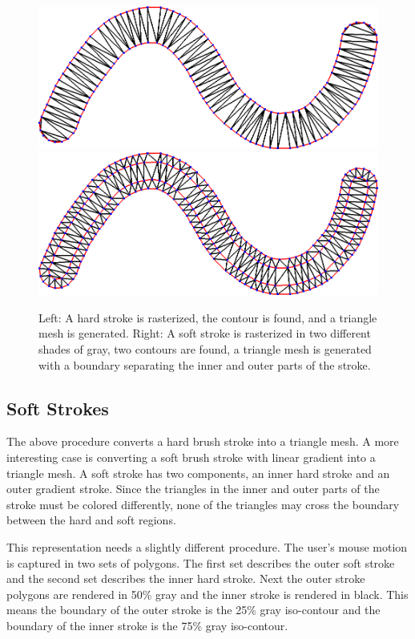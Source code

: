 \documentclass[review]{acmsiggraph}
\begin{document}
\begin{figure}
        \includegraphics[width=\w]{images/stroke_triangulation/hardmesh}
        \includegraphics[width=\w]{images/stroke_triangulation/softmesh}
    \caption{Left: A hard stroke is rasterized, the contour is found, and a triangle mesh is generated.
             Right: A soft stroke is rasterized in two different shades of gray, two contours are found,
             a triangle mesh is generated with a boundary separating the inner and outer parts of the stroke.}
    \label{fig:rastertotriangles}
\end{figure}



\subsection{Soft Strokes}
The above procedure converts a hard brush stroke into a triangle mesh. A more interesting
case is converting a soft brush stroke with linear gradient into a triangle mesh. A soft stroke has two
components, an inner hard stroke and an outer gradient stroke. Since the triangles in the inner and
outer parts of the stroke must be colored differently, none of the triangles may cross the boundary
between the hard and soft regions.

This representation needs a slightly different procedure. The user's mouse motion
is captured in two sets of polygons. The first set describes the outer soft stroke and the second set describes
the inner hard stroke. Next the outer stroke polygons are rendered in 50\% gray and the inner stroke
is rendered in black. This means the boundary of the outer stroke is the 25\% gray iso-contour and the
boundary of the inner stroke is the 75\% gray iso-contour.
\end{document}
